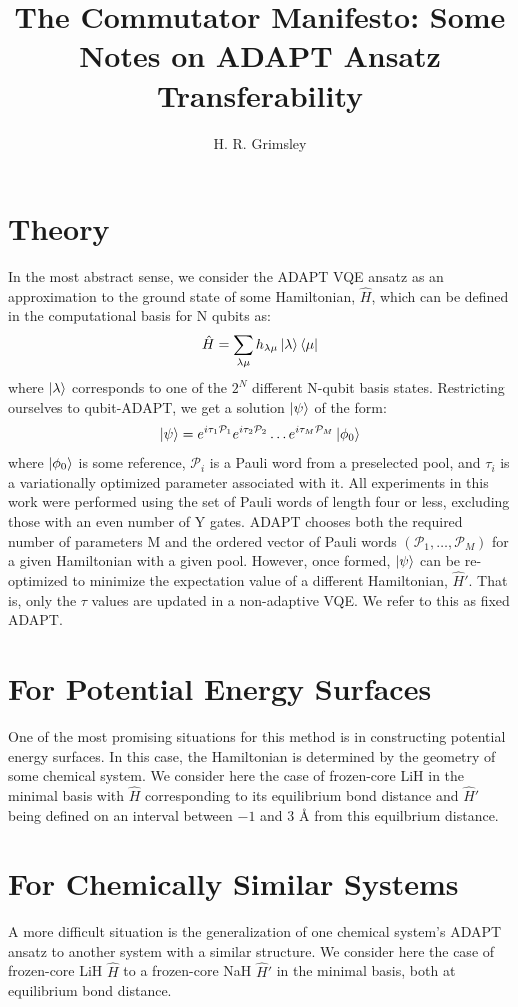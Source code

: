 \documentclass{article}
\title{The Commutator Manifesto:  Some Notes on ADAPT Ansatz Transferability}
\author{H. R. Grimsley}
\begin{document}
\maketitle
\section{Theory}
In the most abstract sense, we consider the ADAPT VQE ansatz as an approximation to the ground state of some Hamiltonian, $\hat{H}$, which can be defined in the computational basis for N qubits as:
\begin{equation}
\hat{H} = \sum_{\lambda\mu} h_{\lambda\mu}\ket{\lambda}\bra{\mu}
\end{equation}
where $\ket{\lambda}$ corresponds to one of the $2^N$ different N-qubit basis states.  Restricting ourselves to qubit-ADAPT, we get a solution $\ket{\psi}$ of the form:
\begin{equation}
\ket{\psi} = e^{i\tau_1\mathcal{P}_1}e^{i\tau_2\mathcal{P}_2}\dots e^{i\tau_M\mathcal{P}_M}\ket{\phi_0}
\end{equation}
where $\ket{\phi_0}$ is some reference, $\mathcal{P}_i$ is a Pauli word from a preselected pool, and $\tau_i$ is a variationally optimized parameter associated with it.  All experiments in this work were performed using the set of Pauli words of length four or less, excluding those with an even number of Y gates.  ADAPT chooses both the required number of parameters M and the ordered vector of Pauli words $\left( \mathcal{P}_1, \dots, \mathcal{P}_M\right)$ for a given Hamiltonian with a given pool.  However, once formed, $\ket{\psi}$ can be re-optimized to minimize the expectation value of a different Hamiltonian, $\hat{H}'$.  That is, only the $\tau$ values are updated in a non-adaptive VQE.  We refer to this as fixed ADAPT.
\section{For Potential Energy Surfaces}
One of the most promising situations for this method is in constructing potential energy surfaces.  In this case, the Hamiltonian is determined by the geometry of some chemical system.  We consider here the case of frozen-core LiH in the minimal basis with $\hat{H}$ corresponding to its equilibrium bond distance and $\hat{H}'$ being defined on an interval between $-1$ and $3$ $\text{\AA}$ from this equilbrium distance.
\section{For Chemically Similar Systems}
A more difficult situation is the generalization of one chemical system's ADAPT ansatz to another system with a similar structure.  We consider here the case of frozen-core LiH $\hat{H}$ to a frozen-core NaH $\hat{H}'$ in the minimal basis, both at equilibrium bond distance.
\end{document}

